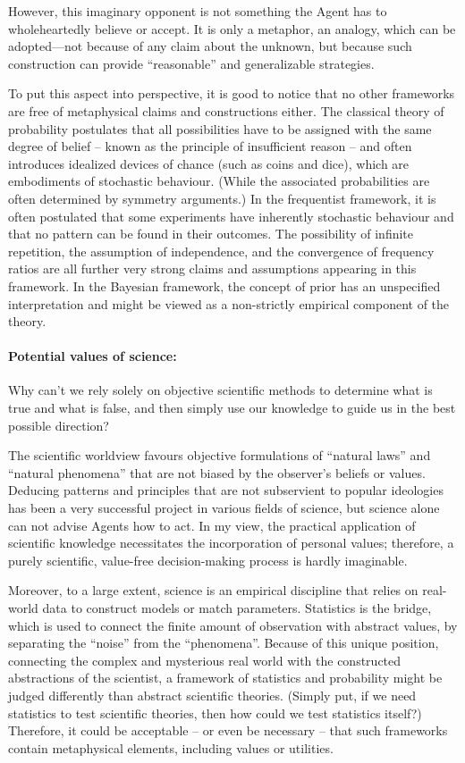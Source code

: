 \documentclass{article}
\begin{document}
However, this imaginary opponent is not something the Agent has to wholeheartedly believe or accept. It is only a metaphor, an analogy, which can be adopted—not because of any claim about the unknown, but because such construction can provide ``reasonable'' and generalizable strategies.

To put this aspect into perspective, it is good to notice that no other frameworks are free of metaphysical claims and constructions either.
The classical theory of probability postulates that all possibilities have to be assigned with the same degree of belief -- known as the principle of insufficient reason -- and often introduces idealized devices of chance (such as coins and dice), which are embodiments of stochastic behaviour. (While the associated probabilities are often determined by symmetry arguments.)
In the frequentist framework, it is often postulated that some experiments have inherently stochastic behaviour and that no pattern can be found in their outcomes. The possibility of infinite repetition, the assumption of independence, and the convergence of frequency ratios are all further very strong claims and assumptions appearing in this framework.
In the Bayesian framework, the concept of prior has an unspecified interpretation and might be viewed as a non-strictly empirical component of the theory.

\paragraph{Potential values of science:}
Why can't we rely solely on objective scientific methods to determine what is true and what is false, and then simply use our knowledge to guide us in the best possible direction?

The scientific worldview favours objective formulations of ``natural laws'' and ``natural phenomena'' that are not biased by the observer’s beliefs or values. Deducing patterns and principles that are not subservient to popular ideologies has been a very successful project in various fields of science, but science alone can not advise Agents how to act.
In my view, the practical application of scientific knowledge necessitates the incorporation of personal values; therefore, a purely scientific, value-free decision-making process is hardly imaginable.

Moreover, to a large extent, science is an empirical discipline that relies on real-world data to construct models or match parameters. Statistics is the bridge, which is used to connect the finite amount of observation with abstract values, by separating the ``noise'' from the ``phenomena''. Because of this unique position, connecting the complex and mysterious real world with the constructed abstractions of the scientist, a framework of statistics and probability might be judged differently than abstract scientific theories. (Simply put, if we need statistics to test scientific theories, then how could we test statistics itself?) Therefore, it could be acceptable -- or even be necessary -- that such frameworks contain metaphysical elements, including values or utilities. 
\end{document}
